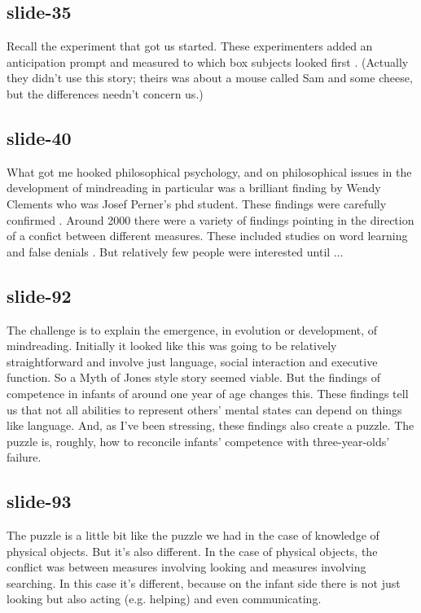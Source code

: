 \documentclass[12pt,\papersize]{extarticle}
\begin{document}
 
\subsection{slide-35}
Recall the experiment that got us started.
These experimenters added an anticipation prompt and measured to which box subjects looked first \citep{Clements:1994cw}.
(Actually they didn't use this story; theirs was about a mouse called Sam and some cheese, but the differences needn't concern us.)
 
 
\subsection{slide-40}
What got me hooked philosophical psychology, and on philosophical issues in the development of mindreading in particular was a brilliant finding by Wendy Clements who was Josef Perner's phd student.
These findings were carefully confirmed \citep{Clements:2000nc,Garnham:2001ql,Ruffman:2001ng}.
Around 2000 there were a variety of findings pointing in the direction of a confict between different measures.
These included studies on word learning \citep{Carpenter:2002gc,Happe:2002sr} and false denials \citep{Polak:1999xr}.
But relatively few people were interested until ...
 
 
\subsection{slide-92}
The challenge is to explain the emergence, in evolution or development, of mindreading.
Initially it looked like this was going to be relatively straightforward and involve just language, social interaction and executive function.
So a Myth of Jones style story seemed viable.
But the findings of competence in infants of around one year of age changes this.
These findings tell us that not all abilities to represent others' mental states can depend on things like language.
And, as I've been stressing, these findings also create a puzzle.
The puzzle is, roughly, how to reconcile infants' competence with three-year-olds' failure.
 
 
\subsection{slide-93}
The puzzle is a little bit like the puzzle we had in the case of knowledge of physical objects.
But it's also different.
In the case of physical objects, the conflict was between measures involving looking and measures involving searching.
In this case it's different, because on the infant side there is not just looking but also acting (e.g. helping) and even communicating.
 
\end{document}
